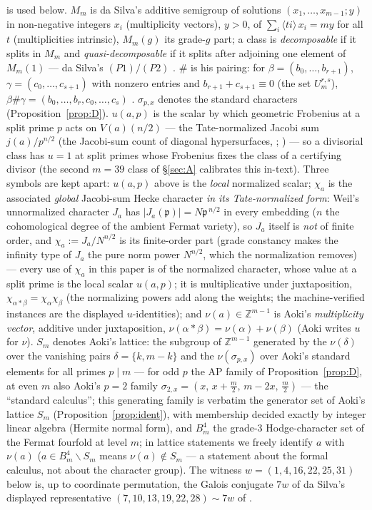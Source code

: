 \documentclass[11pt]{amsart}
\theoremstyle{remark}
\newcommand{\Z}{\mathbb{Z}}
\newcommand{\fr}[1]{\langle #1\rangle}
\newcommand{\V}{V}
\begin{document}
is used below. $M_m$ is da Silva's additive semigroup of solutions $(x_1,\dots,x_{m-1};y)$ in non-negative
integers $x_i$ (multiplicity vectors), $y>0$, of
$\sum_i\fr{ti}\,x_i=my$ for all $t$ (multiplicities intrinsic), $M_m(g)$ its grade-$g$ part; a class is
\emph{decomposable} if it splits in $M_m$ and \emph{quasi-decomposable} if it splits after adjoining
one element of $M_m(1)$ --- da Silva's $(P1)/(P2)$ \cite[Def.~2.4]{daSilva}. $\#$ is his pairing: for
$\beta=(b_0,\dots,b_{r+1})$, $\gamma=(c_0,\dots,c_{s+1})$ with nonzero entries and
$b_{r+1}+c_{s+1}\equiv0$ (the set $U^{r,s}_m$), $\beta\#\gamma=(b_0,\dots,b_r,c_0,\dots,c_s)$
\cite[before Cor.~2.3]{daSilva}.
$\sigma_{p,x}$ denotes the standard characters (Proposition~\ref{prop:D}). $u(a,p)$ is the scalar by
which geometric Frobenius at a split prime $p$ acts on $\V(a)(n/2)$ --- the Tate-normalized Jacobi sum
$j(a)/p^{n/2}$ (the Jacobi-sum count of diagonal hypersurfaces, \cite[pp.~500--502]{Weil49}; \cite{Weil52}) --- so a divisorial class has $u=1$ at split primes whose
Frobenius fixes the class of a certifying divisor (the second $m=39$ class of
\S\ref{sec:A} calibrates this in-text). Three symbols are kept
apart: $u(a,p)$ above is the \emph{local} normalized scalar; $\chi_a$ is the associated
\emph{global} Jacobi-sum Hecke character \emph{in its Tate-normalized form}: Weil's
unnormalized character $J_a$ \cite{Weil52} has $|J_a(\mathfrak p)|=N\mathfrak p^{\,n/2}$ in
every embedding ($n$ the cohomological degree of the ambient Fermat variety), so $J_a$ itself is
\emph{not} of finite order, and $\chi_a:=J_a/N^{n/2}$ is its finite-order part (grade
constancy makes the infinity type of $J_a$ the pure norm power $N^{n/2}$, which the
normalization removes) --- every use of
$\chi_a$ in this paper is of the normalized character, whose value at a split prime is the
local scalar $u(a,p)$; it is multiplicative under juxtaposition,
$\chi_{\alpha*\beta}=\chi_\alpha\chi_\beta$ (the normalizing powers add along the
weights; the machine-verified instances are the displayed $u$-identities); and
$\nu(a)\in\Z^{m-1}$ is Aoki's
\emph{multiplicity vector}, additive under juxtaposition,
$\nu(\alpha*\beta)=\nu(\alpha)+\nu(\beta)$ (Aoki writes $u$ for $\nu$). $S_m$ denotes
Aoki's lattice: the subgroup of $\Z^{m-1}$
generated by the $\nu(\delta)$ over the vanishing pairs $\delta=\{k,m-k\}$ and the
$\nu(\sigma_{p,x})$ over Aoki's standard elements for all primes $p\mid m$ --- for odd $p$ the AP
family of Proposition~\ref{prop:D}, at even $m$ also Aoki's $p=2$ family
$\sigma_{2,x}=(x,\,x+\frac m2,\,m-2x,\,\frac m2)$ \cite[\S2]{Aoki00} --- the ``standard
calculus''; this generating family is verbatim the generator set of Aoki's lattice $S_m$
(Proposition~\ref{prop:ident}), with membership decided exactly by integer linear
algebra (Hermite normal form), and $B^{4}_m$ the grade-$3$ Hodge-character set
of the Fermat fourfold at level $m$; in lattice statements we freely identify $a$ with $\nu(a)$
($a\in B^4_m\smallsetminus S_m$ means $\nu(a)\notin S_m$ --- a statement about the formal
calculus, not about the character group). The witness $w=(1,4,16,22,25,31)$ below is, up to coordinate permutation, the Galois
conjugate $7w$ of da Silva's displayed
representative $(7,10,13,19,22,28)\sim7w$ of \cite[Prop.~3.4 (= Prop.~3.6 of the arXiv version)]{daSilva}.
\end{document}
